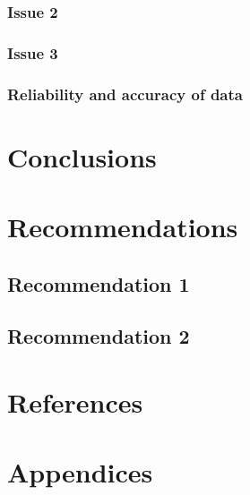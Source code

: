 \documentclass[12pt,a4paper]{article}
\begin{document}
\subsubsection{Issue 2}

\subsubsection{Issue 3}

\subsubsection{Reliability and accuracy of data}

\section{Conclusions}

\section{Recommendations}

\subsection{Recommendation 1}

\subsection{Recommendation 2}

\section{References}

\section{Appendices}
 
\end{document}
